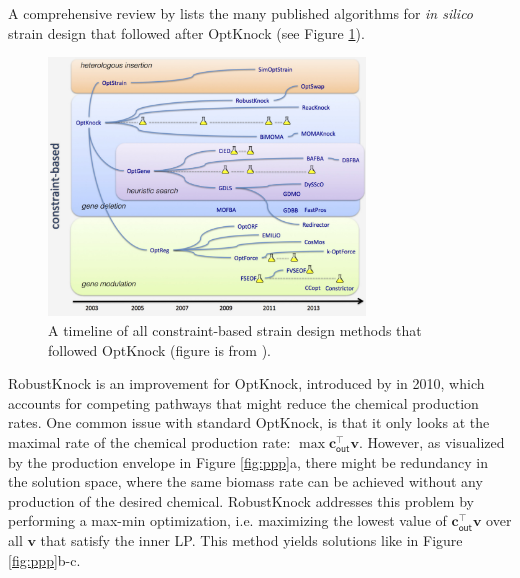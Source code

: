 \documentclass[10pt,a4paper]{article}
\newcommand{\myvector}[1]{{\boldsymbol{#1}}}
\begin{document}
A comprehensive review by \textcite{machado_co-evolution_2015} lists the many published algorithms for \textit{in silico} strain design that followed after OptKnock (see Figure \ref{fig:optknock_derivatives}).
\begin{figure}[ht!]\label{fig:optknock_derivatives}
	\begin{center}
		\includegraphics[width=0.75\textwidth]{optknock_derivatives.png}
	\end{center}
	\caption{A timeline of all constraint-based strain design methods that followed OptKnock (figure is from \cite{machado_co-evolution_2015}).}
\end{figure}

Robust\-Knock is an improvement for Opt\-Knock, introduced by \textcite{tepper_predicting_2010-1} in 2010, which accounts for competing pathways that might reduce the chemical production rates. One common issue with standard Opt\-Knock, is that it only looks at the maximal rate of the chemical production rate: $\max \myvector{c}_\textsf{out}^\top \myvector{v}$. However, as visualized by the production envelope in Figure \ref{fig:ppp}a, there might be redundancy in the solution space, where the same biomass rate can be achieved without any production of the desired chemical. Robust\-Knock addresses this problem by performing a max-min optimization, i.e. maximizing the lowest value of $\myvector{c}_\textsf{out}^\top \myvector{v}$ over all $\myvector{v}$ that satisfy the inner LP. This method yields solutions like in Figure \ref{fig:ppp}b-c.

\printbibliography
\end{document}
